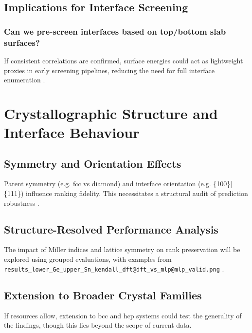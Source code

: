 
\subsection{Implications for Interface Screening}

\subsubsection{Can we pre-screen interfaces based on top/bottom slab surfaces?}

If consistent correlations are confirmed, surface energies could act as lightweight proxies in early screening pipelines, reducing the need for full interface enumeration .

\section{Crystallographic Structure and Interface Behaviour}

\subsection{Symmetry and Orientation Effects}

Parent symmetry (e.g. fcc vs diamond) and interface orientation (e.g. \{100\}|\{111\}) influence ranking fidelity. This necessitates a structural audit of prediction robustness .

\subsection{Structure-Resolved Performance Analysis}

The impact of Miller indices and lattice symmetry on rank preservation will be explored using grouped evaluations, with examples from \texttt{results\_lower\_Ge\_upper\_Sn\_kendall\_dft@dft\_vs\_mlp@mlp\_valid.png} .


\subsection{Extension to Broader Crystal Families}

If resources allow, extension to bcc and hcp systems could test the generality of the findings, though this lies beyond the scope of current data.

